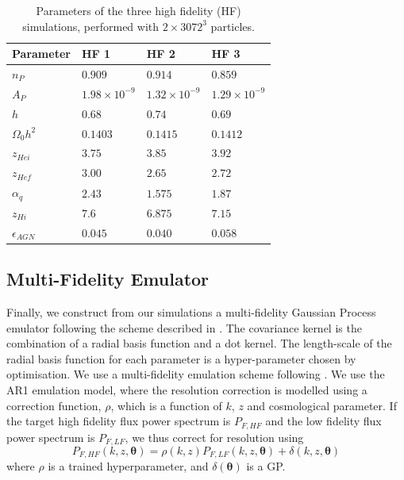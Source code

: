 \documentclass[a4paper,11pt]{article}
\begin{document}
\begin{table}
\begin{centering}
  \begin{tabular}{llll}
  \hline
  Parameter & HF 1 & HF 2 & HF 3\\
    \hline
    $n_P$  &  $0.909$  & $0.914$ & $0.859$ \\
    $A_P$  &  $1.98 \times 10^{-9}$  & $1.32 \times 10^{-9}$ & $1.29 \times 10^{-9}$\\
    $h$    & $0.68$  & $0.74$ & $0.69$\\
    $\Omega_0 h^2$ & $0.1403$ & $0.1415$ & $0.1412$\\
    $z_{Hei}$      & $3.75$  & $3.85$  & $ 3.92$ \\
    $z_{Hef}$      & $3.00$  & $2.65$  & $2.72$\\
    $\alpha_q$     & $2.43$  & $1.575$ & $ 1.87$ \\
    $z_{Hi}$        & $7.6$ & $6.875$   & $7.15 $\\
    $\epsilon_{AGN}$ & $0.045$ & $0.040$ & $ 0.058$\\
    \hline
  \end{tabular}
  \caption{Parameters of the three high fidelity (HF) simulations, performed with $2\times 3072^3$ particles.}
  \label{tab:highfidelity}
  \end{centering}
\end{table}

\subsection{Multi-Fidelity Emulator}

Finally, we construct from our simulations a multi-fidelity Gaussian Process emulator following the scheme described in \cite{Bird:2019, Fernandez:2022}. The covariance kernel is the combination of a radial basis function and a dot kernel. The length-scale of the radial basis function for each parameter is a hyper-parameter chosen by optimisation.
We use a multi-fidelity emulation scheme following \cite{Fernandez:2022}. We use the AR1 emulation model, where the resolution correction is modelled using a correction function, $\rho$, which is a function of $k$, $z$ and cosmological parameter. If the target high fidelity flux power spectrum is $P_{F, HF}$ and the low fidelity flux power spectrum is  $P_{F, LF}$, we thus correct for resolution using
\begin{equation}
 P_{F, HF}(k, z, \boldsymbol{\theta}) =  \rho(k, z) P_{F, LF}(k,z,\boldsymbol{\theta}) + \delta(k, z, \boldsymbol{\theta})
    \label{eq:mf_model}
\end{equation}
where $\rho$ is a trained hyperparameter, and $\delta(\boldsymbol{\theta})$ is a GP.
\end{document}
